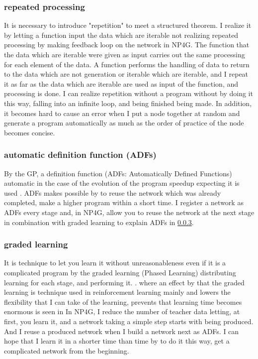 \documentclass{article}
\begin{document}
\subsubsection {repeated processing}
It is necessary to introduce "repetition" to meet a structured theorem.
I realize it by letting a function input the data which are iterable not realizing repeated processing by making feedback loop on the network in NP4G.
The function that the data which are iterable were given as input carries out the same processing for each element of the data.
A function performs the handling of data to return to the data which are not generation or iterable which are iterable, and I repeat it as far as the data which are iterable are used as input of the function, and processing is done.
I can realize repetition without a program without by doing it this way, falling into an infinite loop, and being finished being made.
In addition, it becomes hard to cause an error when I put a node together at random and generate a program automatically as much as the order of practice of the node becomes concise.
\subsubsection {automatic definition function (ADFs)}
By the GP, a definition function (ADFs: Automatically Defined Functions) automatic in the case of the evolution of the program speedup expecting it is used \cite{adfs}.
ADFs makes possible by to reuse the network which was already completed, make a higher program within a short time.
I register a network as ADFs every stage and, in NP4G, allow you to reuse the network at the next stage in combination with graded learning to explain ADFs in \ref{sec:PL}.
\subsubsection {graded learning}
\label{sec:PL}
It is technique to let you learn it without unreasonableness even if it is a complicated program by the graded learning (Phased Learning) distributing learning for each stage, and performing it.
\cite{hodohara2012reinforcement}. where an effect by that the graded learning is technique used in reinforcement learning mainly and lowers the flexibility that I can take of the learning, prevents that learning time becomes enormous is seen in
In NP4G, I reduce the number of teacher data letting, at first, you learn it, and a network taking a simple step starts with being produced.
And I reuse a produced network when I build a network next as ADFs.
I can hope that I learn it in a shorter time than time by to do it this way, get a complicated network from the beginning.
\end{document}
